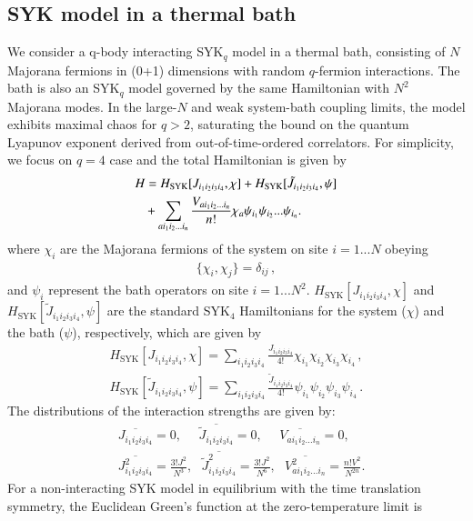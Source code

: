 \subsection{SYK model in a thermal bath}
We consider a q-body interacting SYK$_q$ model in a thermal bath, consisting of $N$ Majorana fermions in (0+1) dimensions with random $q$-fermion interactions. The bath is also an SYK$_q$ model governed by the same Hamiltonian with $N^2$ Majorana modes. In the large-$N$ and weak system-bath coupling limits, the model exhibits maximal chaos for $q>2$, saturating the bound on the quantum Lyapunov exponent derived from out-of-time-ordered correlators. For simplicity, we focus on $q=4$ case and the total Hamiltonian is given by
\begin{align}
&H=H_{\text{SYK}}[J_{i_1i_2i_3i_4},\chi]+H_{\text{SYK}}[\tilde{J}_{i_1i_2i_3i_4},\psi]\notag\\&\ \ \ +\sum_{ai_1i_2...i_n}\frac{V_{ai_1i_2...i_n}}{n!}\chi_a\psi_{i_1}\psi_{i_2}...\psi_{i_n}.\label{eq:H}
\end{align}
where $\chi_i$ are the Majorana fermions of the system on site $i=1... N$ obeying 
\begin{align}
\{\chi_i,\chi_j\}=\delta_{ij}\,,    
\end{align}
and $\psi_i$ represent the bath operators on site $i=1... N^2$. $H_{\text{SYK}}[J_{i_1i_2i_3i_4},\chi]$ and $H_{\text{SYK}}[\tilde J_{i_1i_2i_3i_4},\psi]$ are the standard SYK$_4$ Hamiltonians for the system ($\chi$) and the bath ($\psi$), respectively, which are given by
\begin{align}
H_{\text{SYK}}[J_{i_1i_2i_3i_4},\chi]=\sum_{i_1i_2i_3i_4}\frac{J_{i_1i_2i_3i_4}}{4!}\chi_{i_1}\chi_{i_2}\chi_{i_3}\chi_{i_4}\,,\\
H_{\text{SYK}}[\tilde J_{i_1i_2i_3i_4},\psi]=\sum_{i_1i_2i_3i_4}\frac{\tilde J_{i_1i_2i_3i_4}}{4!}\psi_{i_1}\psi_{i_2}\psi_{i_3}\psi_{i_4}\,.
\label{1}
\end{align}
The distributions of the interaction strengths are given by:
\begin{align}
&\overline{J_{i_1i_2i_3i_4}}=0,\ \ \ \ \ \ \overline{\tilde{J}_{i_1i_2i_3i_4}}=0,\ \ \ \ \ \ \overline{V_{ai_1i_2...i_n}}=0,\\
&\overline{J_{i_1i_2i_3i_4}^2}=\frac{3!J^2}{N^3},\ \ \ \overline{\tilde{J}_{i_1i_2i_3i_4}^2}=\frac{3!J^2}{N^6},\ \ \ \overline{V_{ai_1i_2...i_n}^2}=\frac{n!V^2}{N^{2n}}.
\end{align}
For a non-interacting SYK model in equilibrium with the time translation symmetry, the Euclidean Green's function at the zero-temperature limit is
